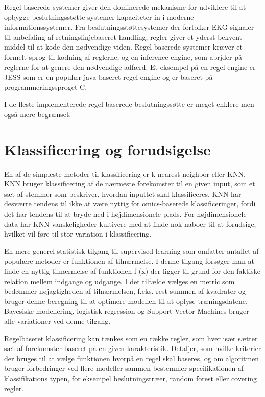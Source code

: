Regel-baserede systemer giver den dominerede mekanisme for udviklere til at opbygge beslutningsstøtte systemer kapaciteter in i moderne informationssystemer. Fra beslutningsstøttesystemer der fortolker EKG-signaler til anbefaling af retningslinjebaseret handling, regler giver et yderst bekvent middel til at kode den nødvendige viden. \citep{Masys2006a}
Regel-baserede systemer kræver et formelt sprog til kodning af reglerne, og en inference engine, som abrjder på reglerne for at genere den nødvendige adfærd. Et eksempel på en regel engine er JESS som er en populær java-baseret regel engine og er baseret på programmeringssproget C. 

I de fleste implementerede regel-baserede beslutningssøtte er meget enklere men også mere begrænset. \citep{Masys2006a}

\section{Klassificering og forudsigelse}
En af de simpleste metoder til klassificering er k-nearest-neighbor eller KNN. KNN bruger klassificering af de nærmeste forekomster til en given input, som et sæt af stemmer som beskriver, hvordan inputtet skal klassificeres.
KNN har desværre tendens til ikke at være nyttig for omics-baserede klassificeringer, fordi det har tendens til at bryde ned i højdimensionele plads. For højdimensionele data har KNN vanskeligheder kultivere med at finde nok naboer til at forudsige, hvilket vil føre til stor variation i klassificering. \citep{Masys2006a}

En mere generel statistisk tilgang til supervised learning
som omfatter antallet af populære metoder er funktionen af tilnærmelse. I denne tilgang forsøger man at
finde en nyttig tilnærmelse af funktionen f (x)
der ligger til grund for den faktiske relation mellem
indgange og udgange. I det tilfælde vælges en metric som bedømmer nøjagtigheden af tilnærmelsen, f.eks. rest summen af kvadrater og bruger denne beregning til at optimere modellen til at oplyse træningsdatene. Bayesiske modellering, logistisk regression og Support Vector Machines bruger alle variationer ved denne tilgang.\citep{Masys2006a}

Regelbaseret klassificering kan tænkes som
en række regler, som hver især sætter sæt af
forekomster baseret på en given karakteristik. Detaljer,
som hvilke kriterier der bruges til at vælge funktionen
hvorpå en regel skal baseres, og om
algoritmen bruger forbedringer ved flere modeller sammen bestemmer specifikationen af klassifikations typen, for eksempel beslutningstræer, random forest eller covering
regler. \citep{Masys2006a}

